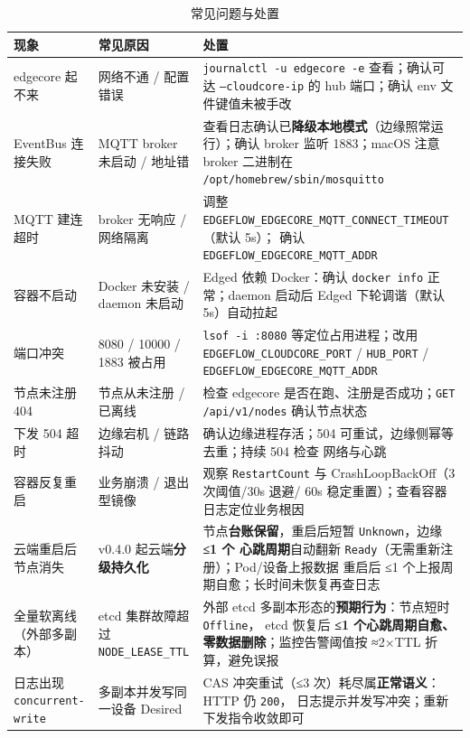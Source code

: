 \begin{table}[htbp]
\centering
\caption{常见问题与处置}
\label{tab:9-faq}
\begin{tabularx}{\textwidth}{l l X}
\toprule
\textbf{现象} & \textbf{常见原因} & \textbf{处置} \\
\midrule
edgecore 起不来 & 网络不通 / 配置错误 &
\texttt{journalctl -u edgecore -e} 查看；确认可达
\texttt{--cloudcore-ip} 的 hub 端口；确认 env 文件键值未被手改 \\
EventBus 连接失败 & MQTT broker 未启动 / 地址错 &
查看日志确认已\textbf{降级本地模式}（边缘照常运行）；确认 broker
监听 1883；macOS 注意 broker 二进制在
\texttt{/opt/homebrew/sbin/mosquitto} \\
MQTT 建连超时 & broker 无响应 / 网络隔离 &
调整 \texttt{EDGEFLOW\_EDGECORE\_MQTT\_CONNECT\_TIMEOUT}（默认 5s）；
确认 \texttt{EDGEFLOW\_EDGECORE\_MQTT\_ADDR} \\
容器不启动 & Docker 未安装 / daemon 未启动 &
Edged 依赖 Docker：确认 \texttt{docker info} 正常；daemon 启动后
Edged 下轮调谐（默认 5s）自动拉起 \\
端口冲突 & 8080 / 10000 / 1883 被占用 &
\texttt{lsof -i :8080} 等定位占用进程；改用
\texttt{EDGEFLOW\_CLOUDCORE\_PORT} / \texttt{HUB\_PORT} /
\texttt{EDGEFLOW\_EDGECORE\_MQTT\_ADDR} \\
节点未注册 404 & 节点从未注册 / 已离线 &
检查 edgecore 是否在跑、注册是否成功；\texttt{GET /api/v1/nodes}
确认节点状态 \\
下发 504 超时 & 边缘宕机 / 链路抖动 &
确认边缘进程存活；504 可重试，边缘侧幂等去重；持续 504 检查
网络与心跳 \\
容器反复重启 & 业务崩溃 / 退出型镜像 &
观察 \texttt{RestartCount} 与 CrashLoopBackOff（3 次阈值/30s 退避/
60s 稳定重置）；查看容器日志定位业务根因 \\
云端重启后节点消失 & v0.4.0 起云端\textbf{分级持久化} &
节点\textbf{台账保留}，重启后短暂 \texttt{Unknown}，边缘 \textbf{≤1 个
心跳周期}自动翻新 \texttt{Ready}（无需重新注册）；Pod/设备上报数据
重启后 ≤1 个上报周期自愈；长时间未恢复再查日志 \\
全量软离线（外部多副本） & etcd 集群故障超过 \texttt{NODE\_LEASE\_TTL} &
外部 etcd 多副本形态的\textbf{预期行为}：节点短时 \texttt{Offline}，
etcd 恢复后 \textbf{≤1 个心跳周期自愈、零数据删除}；监控告警阈值按
≈2×TTL 折算，避免误报 \\
日志出现 \texttt{concurrent-write} & 多副本并发写同一设备 Desired &
CAS 冲突重试（≤3 次）耗尽属\textbf{正常语义}：HTTP 仍 \texttt{200}，
日志提示并发写冲突；重新下发指令收敛即可 \\

\end{tabularx}
\end{table}

